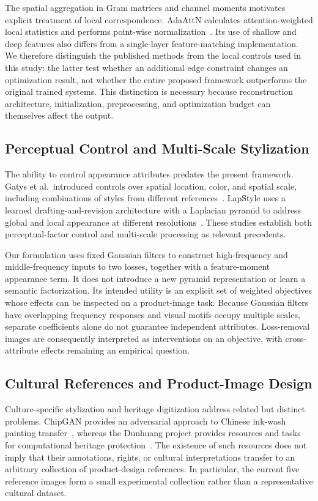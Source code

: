 \documentclass[manuscript,acmlarge,screen,review]{acmart}
\begin{document}
The spatial aggregation in Gram matrices and channel moments motivates explicit treatment of local correspondence. AdaAttN calculates attention-weighted local statistics and performs point-wise normalization~\cite{liu2021}. Its use of shallow and deep features also differs from a single-layer feature-matching implementation. We therefore distinguish the published methods from the local controls used in this study: the latter test whether an additional edge constraint changes an optimization result, not whether the entire proposed framework outperforms the original trained systems. This distinction is necessary because reconstruction architecture, initialization, preprocessing, and optimization budget can themselves affect the output.

\subsection{Perceptual Control and Multi-Scale Stylization}
The ability to control appearance attributes predates the present framework. Gatys et al.\ introduced controls over spatial location, color, and spatial scale, including combinations of styles from different references~\cite{gatys2017control}. LapStyle uses a learned drafting-and-revision architecture with a Laplacian pyramid to address global and local appearance at different resolutions~\cite{lapstyle2021}. These studies establish both perceptual-factor control and multi-scale processing as relevant precedents.

Our formulation uses fixed Gaussian filters to construct high-frequency and middle-frequency inputs to two losses, together with a feature-moment appearance term. It does not introduce a new pyramid representation or learn a semantic factorization. Its intended utility is an explicit set of weighted objectives whose effects can be inspected on a product-image task. Because Gaussian filters have overlapping frequency responses and visual motifs occupy multiple scales, separate coefficients alone do not guarantee independent attributes. Loss-removal images are consequently interpreted as interventions on an objective, with cross-attribute effects remaining an empirical question.

\subsection{Cultural References and Product-Image Design}
Culture-specific stylization and heritage digitization address related but distinct problems. ChipGAN provides an adversarial approach to Chinese ink-wash painting transfer~\cite{he2018}, whereas the Dunhuang project provides resources and tasks for computational heritage protection~\cite{yu2022}. The existence of such resources does not imply that their annotations, rights, or cultural interpretations transfer to an arbitrary collection of product-design references. In particular, the current five reference images form a small experimental collection rather than a representative cultural dataset.
\end{document}
